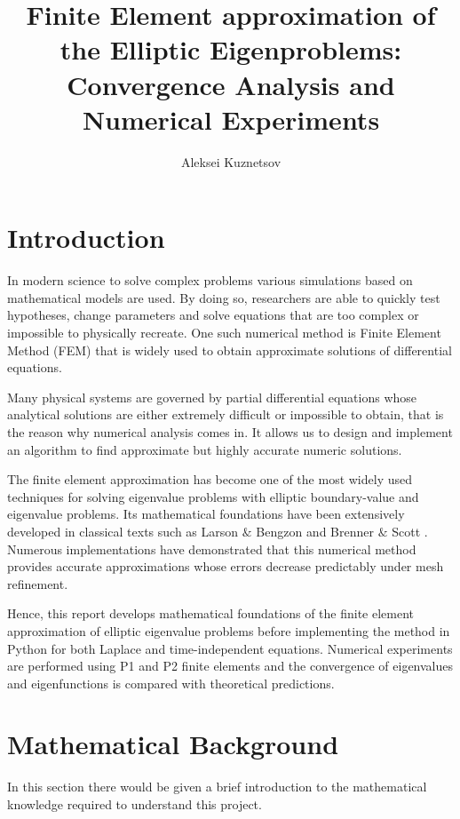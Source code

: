 \documentclass[conference]{IEEEtran}
\begin{document}
\title{Finite Element approximation of the Elliptic Eigenproblems: Convergence Analysis and Numerical Experiments}
\author{Aleksei Kuznetsov}

\maketitle
\section{Introduction}
In modern science to solve complex problems various simulations based on mathematical models are used.
By doing so, researchers are able to quickly test hypotheses, change parameters and solve equations that are too complex or impossible to physically recreate. 
One such numerical method is Finite Element Method (FEM) that is widely used to obtain approximate solutions of differential equations.

Many physical systems are governed by partial differential equations whose analytical solutions are either extremely difficult or impossible to obtain, that is the reason why numerical analysis comes in.
It allows us to design and implement an algorithm to find approximate but highly accurate numeric solutions. 

The finite element approximation has become one of the most widely used techniques for solving eigenvalue problems with elliptic boundary-value and eigenvalue problems. Its mathematical foundations have been extensively developed in classical texts such as Larson $\&$ Bengzon \cite{b10} and Brenner $\&$ Scott \cite{b0.0}. Numerous implementations have demonstrated that this numerical method provides accurate approximations whose errors decrease predictably under mesh refinement.

Hence, this report develops mathematical foundations of the finite element approximation of elliptic eigenvalue problems before implementing the method in Python for both Laplace and time-independent  equations. Numerical experiments are performed using P1 and P2 finite elements and the convergence of eigenvalues and eigenfunctions is compared with theoretical predictions.



\section{Mathematical Background}
In this section there would be given a brief introduction to the mathematical knowledge required to understand this project.
\end{document}
